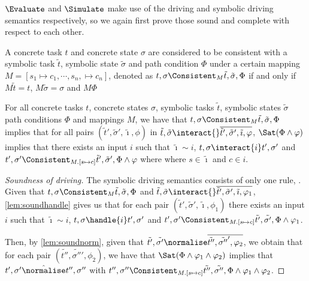$\Evaluate$ and $\Simulate$ make use of the driving and symbolic driving semantics respectively, so we again first prove those sound and complete with respect to each other.


\begin{definition}
A concrete task $t$ and concrete state $\sigma$
are considered to be consistent with a symbolic task $\tilde{t}$, symbolic state $\tilde{\sigma}$ and path condition $\Phi$
under a certain mapping $M=[s_1\mapsto c_1,\cdots,s_n,\mapsto c_n]$, denoted as $t,\sigma \Consistent_M \tilde{t},\tilde{\sigma},\Phi$
if and only if $M\tilde{t}=t$, $M\tilde{\sigma}=\sigma$ and $M\Phi$
\end{definition}

\begin{lemma}
  \label{lem:sounddriving}
  For all concrete tasks $t$, concrete states $\sigma$, symbolic tasks $\tilde{t}$, symbolic states $\tilde{\sigma}$ path conditions $\Phi$ and mappings $M$,
  we have that $t,\sigma\Consistent_M\tilde{t},\tilde{\sigma},\Phi$ implies
  that for all pairs $(\tilde{t}',\tilde{\sigma}',\tilde{\imath},\phi)$ in $\tilde{t},\tilde{\sigma}\interact{}\overline{\tilde{t}',\tilde{\sigma}',\tilde{\imath},\phi}$,
  $\Sat(\Phi\land\phi)$ implies that there exists an input $i$ such that $\tilde{\imath}\sim i$,  $t,\sigma\interact{i}t',\sigma'$ and $t',\sigma' \Consistent_{M.[s\mapsto c]} \tilde{t}',\tilde{\sigma}',\Phi\land\phi$ where where $s\in\tilde{\imath}$ and $c\in i$.
\end{lemma}

\begin{proof}[Soundness of driving]
  The symbolic driving semantics consists of only one rule, .
  Given that $t,\sigma\Consistent_M\tilde{t},\tilde{\sigma},\Phi$ and $\tilde{t},\tilde{\sigma}\interact{}\overline{\tilde{t}',\tilde{\sigma}',\tilde{\imath},\phi_1}$,
  \cref{lem:soundhandle} gives us that for each pair $(\tilde{t}',\tilde{\sigma}',\tilde{\imath},\phi_1)$
  there exists an input $i$ such that $\tilde{\imath}\sim i$, $t,\sigma\handle{i}t',\sigma'$
  and $t',\sigma'\Consistent_{M.[s\mapsto c]}\tilde{t'},\tilde{\sigma'},\Phi\land\phi_1$.

  Then, by \cref{lem:soundnorm}, given that $\tilde{t'},\tilde{\sigma'}\normalise\overline{\tilde{t''},\tilde{\sigma''}',\phi_2}$,
  we obtain that for each pair $(\tilde{t''},\tilde{\sigma''}',\phi_2)$, we have that $\Sat(\Phi\land\phi_1\land\phi_2)$ implies
  that $t',\sigma'\hat{\normalise}t'',\sigma''$ with $t'',\sigma''\Consistent_{M.[s\mapsto c]}\tilde{t''},\tilde{\sigma''},\Phi\land\phi_1\land\phi_2$.
\end{proof}




